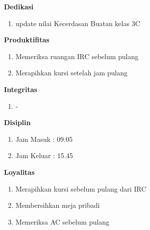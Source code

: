 \begin{enumerate}
\textbf{Dedikasi}
\begin{enumerate}
\item update nilai Kecerdasan Buatan kelas 3C
\end{enumerate}

\textbf{Produktifitas}
\begin{enumerate}
\item Memeriksa ruangan IRC sebelum pulang
\item Merapihkan kursi setelah jam pulang
\end{enumerate}

\textbf{Integritas}
\begin{enumerate}
\item -
\end{enumerate}

\textbf{Disiplin}
\begin{enumerate}
\item Jam Masuk : 09.05
\item Jam Keluar : 15.45
\end{enumerate}

\textbf{Loyalitas}
\begin{enumerate}
\item Merapihkan kursi sebelum pulang dari IRC
\item Membersihkan meja pribadi
\item Memeriksa AC sebelum pulang
\end{enumerate}
\end{enumerate}
